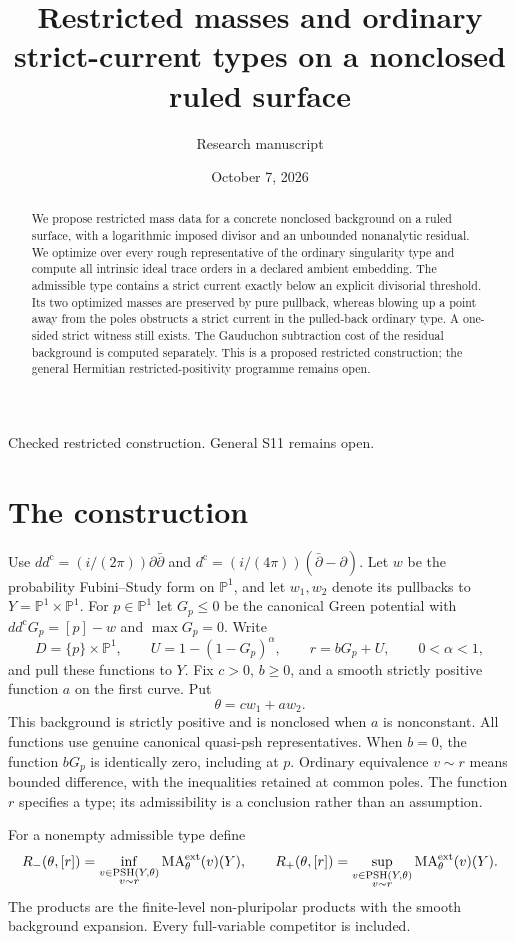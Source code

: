 \documentclass[11pt]{article}
\title{Restricted masses and ordinary strict-current types\newline
on a nonclosed ruled surface}
\author{Research manuscript}
\date{October 7, 2026}
\theoremstyle{remark}
\newcommand{\ddc}{dd^{\mathrm c}}
\newcommand{\dc}{d^{\mathrm c}}
\newcommand{\PSH}{\operatorname{PSH}}
\newcommand{\MA}{\operatorname{MA}}
\newcommand{\PP}{\mathbb P}
\begin{document}
\maketitle
\begin{center}
\small Checked restricted construction. General S11 remains open.
\end{center}
\begin{abstract}
We propose restricted mass data for a concrete nonclosed background on a
ruled surface, with a logarithmic imposed divisor and an unbounded
nonanalytic residual. We optimize over every rough representative of the
ordinary singularity type and compute all intrinsic ideal trace orders in
a declared ambient embedding. The admissible type contains a strict current
exactly below an explicit divisorial threshold. Its two optimized masses
are preserved by pure pullback, whereas blowing up a point away from the
poles obstructs a strict current in the pulled-back ordinary type. A
one-sided strict witness still exists. The Gauduchon subtraction cost of
the residual background is computed separately. This is a proposed
restricted construction; the general Hermitian restricted-positivity
programme remains open.
\end{abstract}

\section{The construction}
Use $\ddc=(i/(2\pi))\partial\bar\partial$ and
$\dc=(i/(4\pi))(\bar\partial-\partial)$. Let $w$ be the probability
Fubini--Study form on $\PP^1$, and let $w_1,w_2$ denote its pullbacks to
$Y=\PP^1\times\PP^1$. For $p\in\PP^1$ let $G_p\leq0$ be the canonical
Green potential with $\ddc G_p=[p]-w$ and $\max G_p=0$. Write
\[
 D=\{p\}\times\PP^1,\qquad
 U=1-(1-G_p)^\alpha,\qquad
 r=bG_p+U,\qquad 0<\alpha<1,
\]
and pull these functions to $Y$. Fix $c>0$, $b\geq0$, and a smooth
strictly positive function $a$ on the first curve. Put
\[
 \theta=cw_1+aw_2.
\]
This background is strictly positive and is nonclosed when $a$ is
nonconstant. All functions use genuine canonical quasi-psh representatives.
When $b=0$, the function $bG_p$ is identically zero, including at $p$.
Ordinary equivalence $v\sim r$ means bounded difference, with the
inequalities retained at common poles. The function $r$ specifies a type;
its admissibility is a conclusion rather than an assumption.

For a nonempty admissible type define
\[
 R_-(\theta,[r])=\inf_{\substack{v\in\PSH(Y,\theta)\\v\sim r}}
                   \MA^{\rm ext}_\theta(v)(Y),\qquad
 R_+(\theta,[r])=\sup_{\substack{v\in\PSH(Y,\theta)\\v\sim r}}
                   \MA^{\rm ext}_\theta(v)(Y).
\]
The products are the finite-level non-pluripolar products with the smooth
background expansion. Every full-variable competitor is included.
\end{document}

